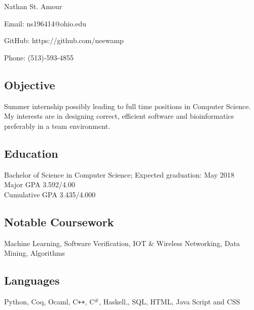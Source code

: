 \documentclass[11pt]{article} %
\date{}
\newcommand{\name}[1]{
  \centerline{\Huge{#1}}
  }
\begin{document}
\thispagestyle{empty}
\name{Nathan St. Amour}
\begin{center}

 
 
\centerline{\large{Email: ns196414@ohio.edu}}
\centerline{GitHub: https://github.com/neewamp}
\centerline{\large{Phone: (513)-593-4855}}

\end{center}
\subsection*{Objective}
 Summer internship possibly leading to full time positions in Computer Science. My interests are in designing correct, efficient software and bioinformatics preferably in a team environment.
 \subsection*{Education}
 Bachelor of Science in Computer Science; Expected graduation: May 2018\\
 Major GPA   3.592/4.00 \\
 Cumulative GPA   3.435/4.000


 \subsection*{Notable Coursework}
Machine Learning, Software Verification, IOT \& Wireless Networking, Data Mining,
Algorithms
\subsection*{Languages}



Python, Coq, Ocaml, C\texttt{++}, C$^\texttt{\#}$, Haskell,, SQL, HTML, Java Script and CSS 
\end{document}
